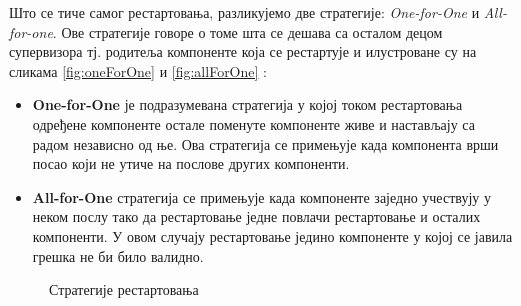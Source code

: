 \documentclass[12pt,oneside]{memoir}
\begin{document}
Што се тиче самог рестартовања, разликујемо две стратегије: \textit{One-for-One} и \textit{All-for-one}. Ове стратегије говоре о томе шта се дешава са осталом децом супервизора тј. родитеља компоненте која се рестартује и илустроване су на сликама \ref{fig:oneForOne} и \ref{fig:allForOne} \cite{progInScala3, akkaDoc}:
\begin{itemize}
\item \textbf{One-for-One} је подразумевана стратегија у којој током рестартовања одређене компоненте остале поменуте компоненте живе и настављају са радом независно од ње. Ова стратегија се примењује када компонента врши посао који не утиче на послове других компоненти.
\item \textbf{All-for-One} стратегија се примењује када компоненте заједно учествују у неком послу тако да рестартовање једне повлачи рестартовање и осталих компоненти. У овом случају рестартовање једино компоненте у којој се јавила грешка не би било валидно.
\end{itemize}

\begin{figure}[!tbp]
  \centering
  \hfill
  \caption{Стратегије рестартовања}
\end{figure}



\end{document}
